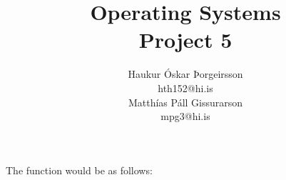 \documentclass[a4]{article}
\title{Operating Systems\\
Project 5}
\author{
    Haukur Óskar Þorgeirsson\\
    hth152@hi.is\\
    Matthías Páll Gissurarson\\
    mpg3@hi.is
}
\begin{document}
\maketitle
The function would be as follows:


\end{document}
